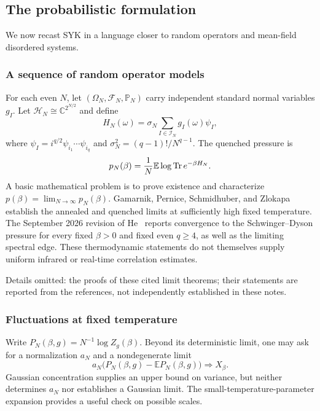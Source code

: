 \documentclass[11pt]{article}
\numberwithin{equation}{section}
\theoremstyle{exposition}
\theoremstyle{result}
\newcommand{\E}{\mathbb E}
\newcommand{\Pp}{\mathbb P}
\newcommand{\C}{\mathbb C}
\newcommand{\cH}{\mathcal H}
\begin{document}
\subsection{The probabilistic formulation}

We now recast SYK in a language closer to random operators and mean-field disordered systems.

\subsubsection{A sequence of random operator models}

For each even $N$, let $(\Omega_N,\mathscr F_N,\Pp_N)$ carry independent standard normal variables $g_I$. Let $\cH_N\cong\C^{2^{N/2}}$ and define
\begin{equation*}
H_N(\omega)=\sigma_N\sum_{I\in\mathcal I_N}g_I(\omega)\psi_I,
\end{equation*}
where $\psi_I=i^{q/2}\psi_{i_1}\cdots\psi_{i_q}$ and $\sigma_N^2=(q-1)!/N^{q-1}$.
The quenched pressure is
\begin{equation*}
p_N(\beta)=\frac1N\E\log\Tr e^{-\beta H_N}.
\end{equation*}
A basic mathematical problem is to prove existence and characterize $p(\beta)=\lim_{N\to\infty}p_N(\beta)$. Gamarnik, Pernice, Schmidhuber, and Zlokapa~\cite{Gamarnik} establish the annealed and quenched limits at sufficiently high fixed temperature. The September 2026 revision of He~\cite{He} reports convergence to the Schwinger--Dyson pressure for every fixed $\beta>0$ and fixed even $q\geq4$, as well as the limiting spectral edge. These thermodynamic statements do not themselves supply uniform infrared or real-time correlation estimates.

Details omitted: the proofs of these cited limit theorems; their statements are reported from the references, not independently established in these notes.

\subsubsection{Fluctuations at fixed temperature}
Write $P_N(\beta,g)=N^{-1}\log Z_g(\beta)$. Beyond its deterministic limit, one may ask for a normalization $a_N$ and a nondegenerate limit
\begin{equation*}
a_N\bigl(P_N(\beta,g)-\E P_N(\beta,g)\bigr)
\Longrightarrow X_\beta.
\end{equation*}
Gaussian concentration supplies an upper bound on variance, but neither determines $a_N$ nor establishes a Gaussian limit. The small-temperature-parameter expansion provides a useful check on possible scales.
\end{document}
